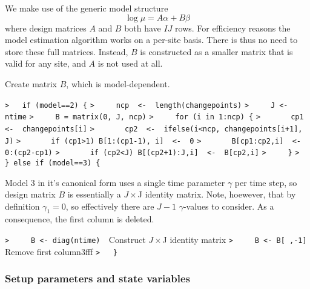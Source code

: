 \documentclass[a4paper]{article}
\begin{document}
We make use of the generic model structure
$$ \log\mu = A\alpha + B\beta $$
where design matrices $A$ and $B$ both have $IJ$ rows.
For efficiency reasons the model estimation algorithm works on a per-site basis.
There is thus no need to store these full matrices. Instead, $B$ is constructed as a
smaller matrix that is valid for any site, and $A$ is not used at all.\par

Create matrix $B$, which is model-dependent.\par
\verb~>   if (model==2) {~\newline
\verb~>     ncp  <-  length(changepoints)~\newline
\verb~>     J <- ntime~\newline
\verb~>     B = matrix(0, J, ncp)~\newline
\verb~>     for (i in 1:ncp) {~\newline
\verb~>       cp1  <-  changepoints[i]~\newline
\verb~>       cp2  <-  ifelse(i<ncp, changepoints[i+1], J)~\newline
\verb~>       if (cp1>1) B[1:(cp1-1), i]  <-  0~\newline
\verb~>       B[cp1:cp2,i]  <-  0:(cp2-cp1)~\newline
\verb~>       if (cp2<J) B[(cp2+1):J,i]  <-  B[cp2,i]~\newline
\verb~>     }~\newline
\verb~>   } else if (model==3) {~\par
Model 3 in it's canonical form uses a single time parameter $\gamma$ per time step,
so design matrix $B$ is essentially a $J\times$J identity matrix.
Note, hoewever, that by definition $\gamma_1=0$, so effectively there are $J-1$ $\gamma$-values to consider.
As a consequence, the first column is deleted.\par
\verb~>     B <- diag(ntime)  ~{\sffamily Construct $J\times$J identity matrix}\newline
\verb~>     B <- B[ ,-1]  ~{\sffamily Remove first column3fff}\newline
\verb~>   }~\par



\subsubsection{Setup parameters and state variables}\par
\end{document}
